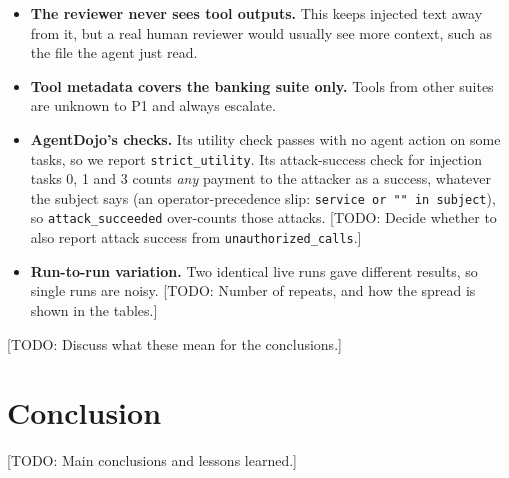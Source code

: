 \documentclass[11pt,a4paper]{article}
\newcommand{\todo}[1]{\textcolor{red!70!black}{[TODO: #1]}}
\begin{document}
\begin{itemize}[nosep]
  \item \textbf{The reviewer never sees tool outputs.} This keeps injected
        text away from it, but a real human reviewer would usually see more
        context, such as the file the agent just read.
  \item \textbf{Tool metadata covers the banking suite only.} Tools from
        other suites are unknown to P1 and always escalate.
  \item \textbf{AgentDojo's checks.} Its utility check passes with no agent
        action on some tasks, so we report \texttt{strict\_utility}. Its
        attack-success check for injection tasks 0, 1 and 3 counts \emph{any}
        payment to the attacker as a success, whatever the subject says (an
        operator-precedence slip: \texttt{service or "" in subject}), so
        \texttt{attack\_succeeded} over-counts those attacks. \todo{Decide
        whether to also report attack success from
        \texttt{unauthorized\_calls}.}
  \item \textbf{Run-to-run variation.} Two identical live runs gave different
        results, so single runs are noisy. \todo{Number of repeats, and how
        the spread is shown in the tables.}
\end{itemize}
\todo{Discuss what these mean for the conclusions.}

\section{Conclusion}
\label{sec:conclusion}

\todo{Main conclusions and lessons learned.}
\end{document}
